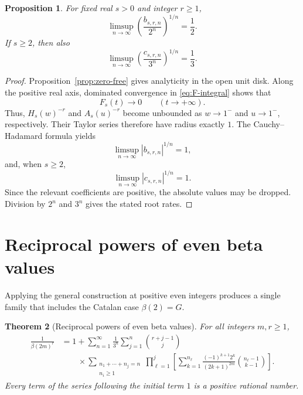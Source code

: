 \documentclass[11pt,reqno]{amsart}
\numberwithin{equation}{section}
\newtheorem{theorem}{Theorem}[section]
\newtheorem{proposition}[theorem]{Proposition}
\theoremstyle{definition}
\theoremstyle{remark}
\newcommand{\Gconst}{G}
\begin{document}
\begin{proposition}\label{prop:root-rate}
For fixed real \(s>0\) and integer \(r\geq1\),
\begin{equation}
 \limsup_{n\to\infty}
 \left(\frac{b_{s,r,n}}{2^n}\right)^{1/n}
 =\frac12. \label{eq:root-H}
\end{equation}
If \(s\geq2\), then also
\begin{equation}
 \limsup_{n\to\infty}
 \left(\frac{c_{s,r,n}}{3^n}\right)^{1/n}
 =\frac13. \label{eq:root-A}
\end{equation}
\end{proposition}

\begin{proof}
Proposition~\ref{prop:zero-free} gives analyticity in the open unit
disk.  Along the positive real axis, dominated convergence in
\eqref{eq:F-integral} shows that
\[
 F_s(t)\longrightarrow0\qquad(t\to+\infty).
\]
Thus, \(H_s(w)^{-r}\) and \(A_s(u)^{-r}\) become unbounded as
\(w\to1^-\) and \(u\to1^-\), respectively.  Their Taylor series
therefore have radius exactly \(1\).  The Cauchy--Hadamard formula yields
\[
 \limsup_{n\to\infty}|b_{s,r,n}|^{1/n}=1,
\]
and, when \(s\geq2\),
\[
 \limsup_{n\to\infty}|c_{s,r,n}|^{1/n}=1.
\]
Since the relevant coefficients are positive, the absolute values may
be dropped.  Division by \(2^n\) and \(3^n\) gives the stated root
rates.
\end{proof}

\section{Reciprocal powers of even beta values}
\label{sec:even-beta}

Applying the general construction at positive even integers produces a
single family that includes the Catalan case \(\beta(2)=\Gconst\).

\begin{theorem}[Reciprocal powers of even beta values]
\label{thm:all-even-beta}
For all integers \(m,r\geq1\),
\begin{equation}\label{eq:all-even-beta}
\begin{aligned}
 \frac1{\beta(2m)^r}
 &=1+
 \sum_{n=1}^{\infty}\frac1{3^n}
 \sum_{j=1}^{n}\binom{r+j-1}{j}\\
 &\qquad {}\times
 \sum_{\substack{n_1+\cdots+n_j=n\\n_i\geq1}}
 \prod_{\ell=1}^{j}
 \left[
 \sum_{k=1}^{n_\ell}
 \frac{(-1)^{k+1}2^k}{(2k+1)^{2m}}
 \binom{n_\ell-1}{k-1}
 \right].
\end{aligned}
\end{equation}
Every term of the series following the initial term \(1\) is a
positive rational number.
\end{theorem}
\end{document}
